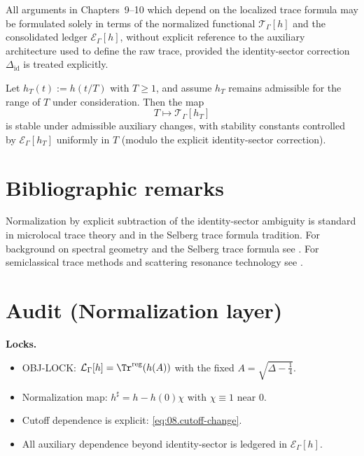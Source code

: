 \begin{corollary}\label{cor:08.drop-in}
All arguments in Chapters~9--10 which depend on the localized trace formula may be formulated solely in terms of
the normalized functional $\mathcal T_\Gamma[h]$ and the consolidated ledger $\mathcal E_\Gamma[h]$,
without explicit reference to the auxiliary architecture used to define the raw trace, provided the identity-sector
correction $\Delta_{\mathrm{id}}$ is treated explicitly.
\end{corollary}

\begin{corollary}\label{cor:08.rescaling}
Let $h_T(t):=h(t/T)$ with $T\ge 1$, and assume $h_T$ remains admissible for the range of $T$ under consideration.
Then the map
\[
T\longmapsto \mathcal T_\Gamma[h_T]
\]
is stable under admissible auxiliary changes, with stability constants controlled by $\mathcal E_\Gamma[h_T]$ uniformly in $T$
(modulo the explicit identity-sector correction).
\end{corollary}

\section{Bibliographic remarks}\label{sec:08.bib}

Normalization by explicit subtraction of the identity-sector ambiguity is standard in microlocal trace theory and in the Selberg
trace formula tradition. For background on spectral geometry and the Selberg trace formula see
\cite{Buser1992,Hejhal1983,Iwaniec2002}. For semiclassical trace methods and scattering resonance technology see
\cite{Zworski2012,DyatlovZworski2019}.


\section*{Audit (Normalization layer)}\label{sec:08.audit}

\noindent\textbf{Locks.}
\begin{itemize}
\item[(L8.1)] OBJ-LOCK: $\mathcal L_\Gamma[h]=\Tr^{\mathrm{reg}}(h(A))$ with the fixed $A=\sqrt{\Delta-\tfrac14}$.
\item[(L8.2)] Normalization map: $h^\sharp=h-h(0)\chi$ with $\chi\equiv1$ near $0$.
\item[(L8.3)] Cutoff dependence is explicit: \eqref{eq:08.cutoff-change}.
\item[(L8.4)] All auxiliary dependence beyond identity-sector is ledgered in $\mathcal E_\Gamma[h]$.
\end{itemize}

